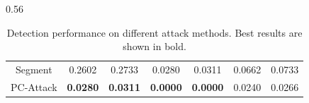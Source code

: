 \begin{table}[t]
\begin{varwidth}[b]{0.56\linewidth}
{\begin{tabular}{ccccccc}
		Segment                                                              & 0.2602          & 0.2733          & 0.0280          & 0.0311          & 0.0662          & 0.0733          \\
		PC-Attack                                                            & \textbf{0.0280} & \textbf{0.0311} & \textbf{0.0000} & \textbf{0.0000} & 0.0240          & 0.0266          \\ \hline
		\end{tabular}
    }
   \caption{Detection performance on different attack methods. Best results are shown in bold.}
   \label{tab:det}
  \end{varwidth}
\end{table}





